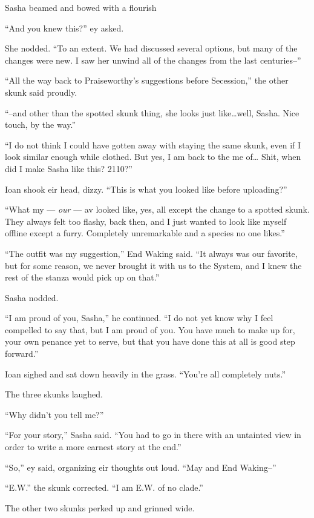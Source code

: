 Sasha beamed and bowed with a flourish

``And you knew this?'' ey asked.

She nodded. ``To an extent. We had discussed several options, but many of the changes were new. I saw her unwind all of the changes from the last centuries--''

``All the way back to Praiseworthy's suggestions before Secession,'' the other skunk said proudly.

``--and other than the spotted skunk thing, she looks just like\ldots well, Sasha. Nice touch, by the way.''

``I do not think I could have gotten away with staying the same skunk, even if I look similar enough while clothed. But yes, I am back to the me of\ldots{} Shit, when did I make Sasha like this? 2110?''

Ioan shook eir head, dizzy. ``This is what you looked like before uploading?''

``What my — \emph{our} — av looked like, yes, all except the change to a spotted skunk. They always felt too flashy, back then, and I just wanted to look like myself offline except a furry. Completely unremarkable and a species no one likes.''

``The outfit was my suggestion,'' End Waking said. ``It always was our favorite, but for some reason, we never brought it with us to the System, and I knew the rest of the stanza would pick up on that.''

Sasha nodded.

``I am proud of you, Sasha,'' he continued. ``I do not yet know why I feel compelled to say that, but I am proud of you. You have much to make up for, your own penance yet to serve, but that you have done this at all is good step forward.''

Ioan sighed and sat down heavily in the grass. ``You're all completely nuts.''

The three skunks laughed.

``Why didn't you tell me?''

``For your story,'' Sasha said. ``You had to go in there with an untainted view in order to write a more earnest story at the end.''

``So,'' ey said, organizing eir thoughts out loud. ``May and End Waking--''

``E.W.'' the skunk corrected. ``I am E.W. of no clade.''

The other two skunks perked up and grinned wide.

